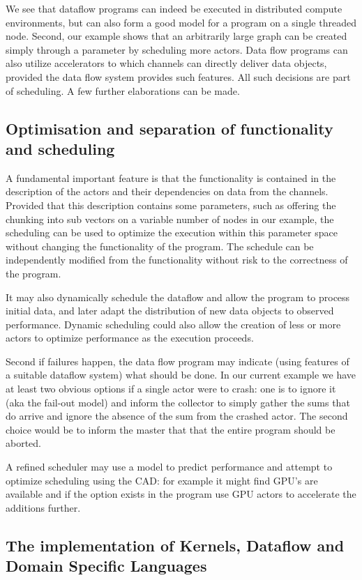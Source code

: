 \documentclass[11pt,a4paper]{article}
\begin{document}
We see that dataflow programs can indeed be executed in distributed
compute environments, but can also form a good model for a program on
a single threaded node.  Second, our example shows that an arbitrarily
large graph can be created simply through a parameter by scheduling
more actors.  Data flow programs can also utilize accelerators to
which channels can directly deliver data objects, provided the data
flow system provides such features.  All such decisions are part of
scheduling.  A few further elaborations can be made.

\subsection{Optimisation and separation of functionality and scheduling}

A fundamental important feature is that the functionality is contained
in the description of the actors and their dependencies on data from
the channels.  Provided that this description contains some
parameters, such as offering the chunking into sub vectors on a
variable number of nodes in our example, the scheduling can be used to
optimize the execution within this parameter space without changing
the functionality of the program.  The schedule can be independently
modified from the functionality without risk to the correctness of the
program.

It may also dynamically schedule the dataflow and allow the program to
process initial data, and later adapt the distribution of new data
objects to observed performance.  Dynamic scheduling could also allow
the creation of less or more actors to optimize performance as the
execution proceeds.

Second if failures happen, the data flow program may indicate (using
features of a suitable dataflow system) what should be done.  In our
current example we have at least two obvious options if a single actor
were to crash: one is to ignore it (aka the fail-out model) and inform
the collector to simply gather the sums that do arrive and ignore the
absence of the sum from the crashed actor.  The second choice would be
to inform the master that that the entire program should be aborted.

A refined scheduler may use a model to predict performance and attempt
to optimize scheduling using the CAD: for example it might find GPU’s
are available and if the option exists in the program use GPU actors
to accelerate the additions further.


\subsection{The implementation of Kernels, Dataflow and Domain Specific Languages}
\end{document}
